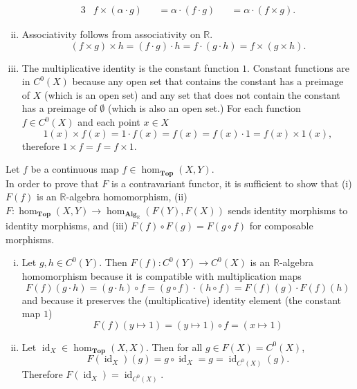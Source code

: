 \documentclass{article}
\newenvironment{problem}[2][Problem]{\begin{trivlist}
\item[\hskip \labelsep {\bfseries #1}\hskip \labelsep {\bfseries #2.}]}{\end{trivlist}}
\newenvironment{problempart}[1]{\begin{trivlist}\item[\textbf{Part #1.}]}{\end{trivlist}}
\begin{document}
\begin{problem}{7}
\begin{problempart}{(b)}
\begin{enumerate}[(i)]
\begin{alignat*}{3}
        &f \times (\alpha \cdot g) &&= \alpha \cdot (f \cdot g) &&= \alpha \cdot (f \times g).
      \end{alignat*}
      \item Associativity follows from associativity on $\mathbb{R}$. \[
        (f \times g) \times h = (f \cdot g) \cdot h = f \cdot (g \cdot h) = f \times (g \times h).
      \]
      \item The multiplicative identity is the constant function $1$. Constant
      functions are in $C^0(X)$ because any open set that contains the constant
      has a preimage of $X$ (which is an open set) and any set that does not
      contain the constant has a preimage of $\emptyset$ (which is also an open set.)
      For each function $f\in C^0(X)$ and each point $x \in X$ \[
        1(x) \times f(x) = 1 \cdot f(x) = f(x) = f(x) \cdot 1 = f(x) \times 1(x),
      \] therefore $1 \times f = f = f \times 1$.
    \end{enumerate}
  \end{problempart}
  \begin{problempart}{(c)}
    Let $f$ be a continuous map $f \in \operatorname{hom}_{\textbf{Top}}(X, Y)$.\\
    In order to prove that $F$ is a contravariant functor, it is sufficient to show that
      (i) $F(f)$ is an $\mathbb{R}$-algebra homomorphism,
      (ii) $F\colon\operatorname{hom}_{\textbf{Top}}(X,Y) \rightarrow \operatorname{hom}_{\textbf{Alg}_\mathbb{R}}(F(Y), F(X))$
        sends identity morphisms to identity morphisms, and
      (iii) $F(f) \circ F(g) = F(g\circ f)$ for composable morphisms.
    \begin{enumerate}[(i)]
      \item{
        Let $g,h \in C^0(Y)$.
        Then $F(f)\colon C^0(Y) \rightarrow C^0(X)$ is an $\mathbb{R}$-algebra
        homomorphism because it is compatible with multiplication maps \[
          F(f)(g \cdot h) = (g \cdot h)\circ f
          = (g \circ f) \cdot (h\circ f)
          = F(f)(g) \cdot F(f)(h)
        \] and because it preserves the (multiplicative) identity element
        (the constant map $1$) \[
          F(f)(y\mapsto 1) = (y \mapsto 1) \circ f = (x \mapsto 1)
        \]
      }
      \item{
        Let $\operatorname{id}_X \in \operatorname{hom}_{\textbf{Top}}(X, X)$.
        Then for all $g \in F(X) = C^0(X)$, \[
          F(\operatorname{id}_X)(g) = g \circ \operatorname{id}_X
          = g
          = \operatorname{id}_{C^0(X)}(g).
        \] Therefore $F(\operatorname{id}_X) = \operatorname{id}_{C^0(X)}$.
}
\end{enumerate}
\end{problempart}
\end{problem}
\end{document}
